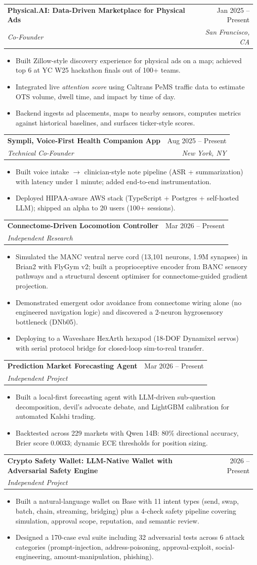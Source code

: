 \documentclass[letterpaper,10pt]{article}
\makeatletter
\newcommand{\resumeItem}[1]{
  \item\small{
    {#1 \vspace{-2pt}}
  }
}
\newcommand{\resumeSubheading}[4]{
  \vspace{-2pt}\item
    \begin{tabular*}{0.97\textwidth}[t]{l@{\extracolsep{\fill}}r}
      \textbf{#1} & #2 \\
      \textit{\small#3} & \textit{\small #4} \\
    \end{tabular*}\vspace{-7pt}
}
\newcommand{\resumeItemListStart}{\begin{itemize}[leftmargin=*]}
\newcommand{\resumeItemListEnd}{\end{itemize}\vspace{-6pt}}
\makeatother
\begin{document}
  \resumeSubheading{Physical.AI: Data-Driven Marketplace for Physical Ads}{Jan 2025 -- Present}{Co-Founder}{San Francisco, CA}
  \resumeItemListStart
    \resumeItem{Built Zillow-style discovery experience for physical ads on a map; achieved top 6 at YC W25 hackathon finals out of 100+ teams.}
    \resumeItem{Integrated live \textit{attention score} using Caltrans PeMS traffic data to estimate OTS volume, dwell time, and impact by time of day.}
    \resumeItem{Backend ingests ad placements, maps to nearby sensors, computes metrics against historical baselines, and surfaces ticker-style scores.}
  \resumeItemListEnd
  \resumeSubheading{Sympli, Voice-First Health Companion App}{Aug 2025 -- Present}{Technical Co-Founder}{New York, NY}
  \resumeItemListStart
    \resumeItem{Built voice intake $\rightarrow$ clinician-style note pipeline (ASR + summarization) with latency under 1 minute; added end-to-end instrumentation.}
    \resumeItem{Deployed HIPAA-aware AWS stack (TypeScript + Postgres + self-hosted LLM); shipped an alpha to 20 users (100+ sessions).}
  \resumeItemListEnd

  \resumeSubheading
    {Connectome-Driven Locomotion Controller}{Mar 2026 -- Present}
    {Independent Research}{}
  \resumeItemListStart
    \resumeItem{Simulated the MANC ventral nerve cord (13,101 neurons, 1.9M synapses) in Brian2 with FlyGym v2; built a proprioceptive encoder from BANC sensory pathways and a structural descent optimiser for connectome-guided gradient projection.}
    \resumeItem{Demonstrated emergent odor avoidance from connectome wiring alone (no engineered navigation logic) and discovered a 2-neuron hygrosensory bottleneck (DNb05).}
    \resumeItem{Deploying to a Waveshare HexArth hexapod (18-DOF Dynamixel servos) with serial protocol bridge for closed-loop sim-to-real transfer.}
  \resumeItemListEnd

  \resumeSubheading
    {Prediction Market Forecasting Agent}{Mar 2026 -- Present}
    {Independent Project}{}
  \resumeItemListStart
    \resumeItem{Built a local-first forecasting agent with LLM-driven sub-question decomposition, devil's advocate debate, and LightGBM calibration for automated Kalshi trading.}
    \resumeItem{Backtested across 229 markets with Qwen 14B: 80\% directional accuracy, Brier score 0.0033; dynamic ECE thresholds for position sizing.}
  \resumeItemListEnd

  \resumeSubheading
    {Crypto Safety Wallet: LLM-Native Wallet with Adversarial Safety Engine}{2026 -- Present}
    {Independent Project}{}
  \resumeItemListStart
    \resumeItem{Built a natural-language wallet on Base with 11 intent types (send, swap, batch, chain, streaming, bridging) plus a 4-check safety pipeline covering simulation, approval scope, reputation, and semantic review.}
    \resumeItem{Designed a 170-case eval suite including 32 adversarial tests across 6 attack categories (prompt-injection, address-poisoning, approval-exploit, social-engineering, amount-manipulation, phishing).}
  \resumeItemListEnd
\end{document}
